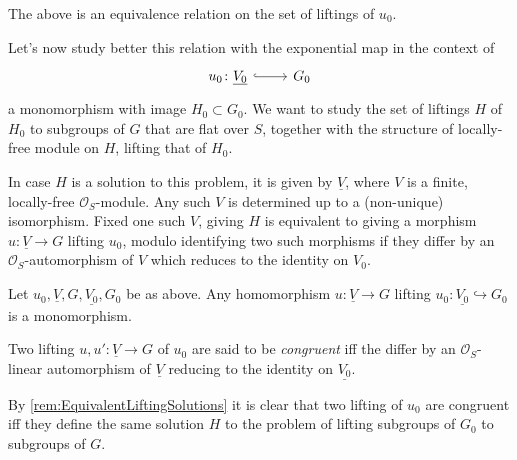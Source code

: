 \begin{rem}[]
	The above is an equivalence relation on the set of liftings of $u_0$.
\end{rem}


\noindent
Let's now study better this relation with the exponential map in the context of
\begin{equation*}
\begin{tikzcd}[row sep = 0ex
	,/tikz/column 1/.append style={anchor=base east}
	,/tikz/column 2/.append style={anchor=base west}]
	u_0\colon \underline{V_0} 
	\arrow[r, "", hookrightarrow] &
	G_0
\end{tikzcd}
\end{equation*} 
a monomorphism with image $H_0 \subset G_0$.
We want to study the set of liftings $H$ of $H_0$ to
subgroups of $G$ that are flat over $S$, together with the structure
of locally-free module on $H$, lifting that of $H_0$.


\begin{rem}\label{rem:EquivalentLiftingSolutions}
	In case $H$ is a solution to this problem, it is given by
	$\underline{V}$, where $V$ is a finite, locally-free $\mathcal{O}_{ S }$-module.
	Any such $V$ is determined up to a (non-unique) isomorphism.
	Fixed one such $V$, giving $H$ is equivalent to giving a morphism
	$u\colon \underline{V} \to G$ lifting $u_0$, modulo identifying
	two such morphisms if they differ by an $\mathcal{O}_{ S }$-automorphism
	of $V$ which reduces to the identity on $V_0$.
\end{rem}


\begin{lem}
	Let $u_0, \underline{V}, G, \underline{V_0}, G_0$ be as above.
	Any homomorphism $u\colon \underline{V} \to G$ lifting 
	$u_0\colon \underline{V_0} \hookrightarrow G_0$
	is a monomorphism.
\end{lem} 


\begin{defn}
	Two lifting $u, u'\colon \underline{V} \to G$ of $u_0$ are said to
	be {\em congruent} iff the differ by an $\mathcal{O}_{ S }$-linear
	automorphism of $\underline{V}$ reducing to the identity on $\underline{V_0}$.
\end{defn}


\begin{rem}[]
	By \cref{rem:EquivalentLiftingSolutions} it is clear that
	two lifting of $u_0$ are congruent iff they define the same solution
	$H$ to the problem of lifting subgroups of $G_0$ to subgroups of $G$.
\end{rem}



